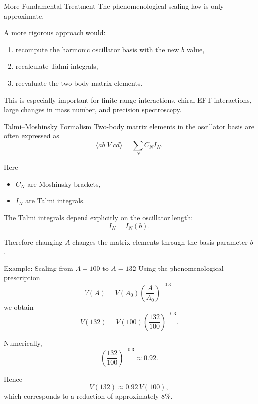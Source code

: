 \documentclass[10pt]{beamer}
\begin{document}
\begin{frame}[t]{More Fundamental Treatment}
\small
The phenomenological scaling law is only approximate.

\medskip

A more rigorous approach would:
\begin{enumerate}
    \item recompute the harmonic oscillator basis with the new \(b\) value,
    \item recalculate Talmi integrals,
    \item reevaluate the two-body matrix elements.
\end{enumerate}

\medskip

This is especially important for finite-range interactions, chiral EFT
interactions, large changes in mass number, and precision spectroscopy.
\end{frame}

\begin{frame}[t]{Talmi--Moshinsky Formalism}
\small
Two-body matrix elements in the oscillator basis are often expressed as
\[
\langle ab|V|cd\rangle = \sum_N C_N I_N .
\]

Here
\begin{itemize}
    \item \(C_N\) are Moshinsky brackets,
    \item \(I_N\) are Talmi integrals.
\end{itemize}

The Talmi integrals depend explicitly on the oscillator length:
\[
I_N=I_N(b) .
\]

Therefore changing \(A\) changes the matrix elements through the basis
parameter \(b\).
\end{frame}

\begin{frame}[t]{Example: Scaling from \(A=100\) to \(A=132\)}
\small
Using the phenomenological prescription
\[
V(A)=V(A_0)\left(\frac{A}{A_0}\right)^{-0.3},
\]
we obtain
\[
V(132)=V(100)\left(\frac{132}{100}\right)^{-0.3} .
\]

Numerically,
\[
\left(\frac{132}{100}\right)^{-0.3}\approx 0.92 .
\]

Hence
\[
V(132)\approx 0.92\,V(100),
\]
which corresponds to a reduction of approximately \(8\%\).
\end{frame}
\end{document}
